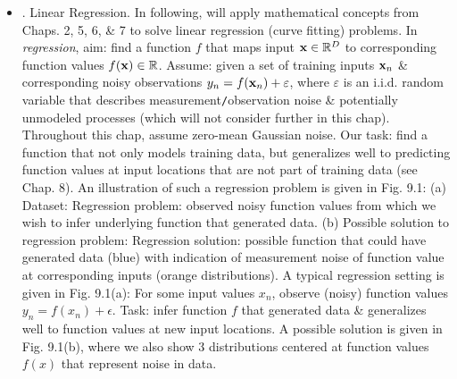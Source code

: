 \documentclass{article}
\begin{document}
\begin{itemize}
\begin{itemize}
		{\it Bayesian information criterion} (BIC) (Schwarz, 1978)
		\begin{equation}
			\log p({\bf x}) = \log\int p({\bf x}|\boldsymbol{\theta})p(\boldsymbol{\theta})\,{\rm d}\boldsymbol{\theta}\approx\log p({\bf x}|\boldsymbol{\theta}) - \frac{1}{2}M\log N
		\end{equation}
		can be used for exponential family distributions. Here, $N$: number of data points \& $M$: number of parameters. BIC penalizes model complexity more heavily than AIC.
	\end{itemize}
	\item {. Linear Regression.} In following, will apply mathematical concepts from Chaps. 2, 5, 6, \& 7 to solve linear regression (curve fitting) problems. In {\it regression}, aim: find a function $f$ that maps input ${\bf x}\in\mathbb{R}^D$ to corresponding function values $f({\bf x})\in\mathbb{R}$. Assume: given a set of training inputs ${\bf x}_n$ \& corresponding noisy observations $y_n = f({\bf x}_n) + \varepsilon$, where $\varepsilon$ is an i.i.d. random variable that describes measurement{\tt/}observation noise \& potentially unmodeled processes (which will not consider further in this chap). Throughout this chap, assume zero-mean Gaussian noise. Our task: find a function that not only models training data, but generalizes well to predicting function values at input locations that are not part of training data (see Chap. 8). An illustration of such a regression problem is given in {\sf Fig. 9.1: (a) Dataset: Regression problem: observed noisy function values from which we wish to infer underlying function that generated data. (b) Possible solution to regression problem: Regression solution: possible function that could have generated data (blue) with indication of measurement noise of function value at corresponding inputs (orange distributions).} A typical regression setting is given in {\sf Fig. 9.1(a)}: For some input values $x_n$, observe (noisy) function values $y_n = f(x_n) + \epsilon$. Task: infer function $f$ that generated data \& generalizes well to function values at new input locations. A possible solution is given in {\sf Fig. 9.1(b)}, where we also show 3 distributions centered at function values $f(x)$ that represent noise in data.
	

\end{itemize}
\end{document}
